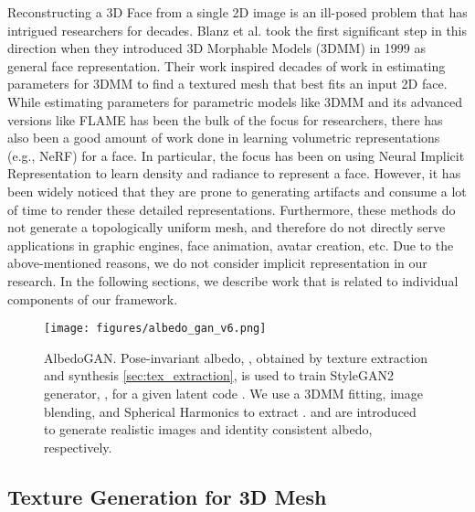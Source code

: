 \documentclass[10pt,twocolumn,letterpaper]{article}
\begin{document}
\label{sec:formatting}


Reconstructing a 3D Face from a single 2D image is an ill-posed problem that has intrigued researchers for decades. Blanz et al. \cite{3dmm} took the first significant step in this direction when they introduced 3D Morphable Models (3DMM) \cite{3dmm} in 1999 as general face representation. Their work inspired decades of work in estimating parameters for 3DMM to find a textured mesh that best fits an input 2D face. While estimating parameters for parametric models like 3DMM and its advanced versions like FLAME \cite{flame} has been the bulk of the focus for researchers, there has also been a good amount of work done in learning volumetric representations (e.g., NeRF) for a face. In particular, the focus has been on using Neural Implicit Representation \cite{neural-head-avatars, nerface, imavatar, lolnerf, pi_gan, mofa_nerf} to learn density and radiance to represent a face. However, it has been widely noticed that they are prone to generating artifacts and consume a lot of time to render these detailed representations. Furthermore, these methods do not generate a topologically uniform mesh, and therefore do not directly serve applications in graphic engines, face animation, avatar creation, etc. Due to the above-mentioned reasons, we do not consider implicit representation in our research. In the following sections, we describe work that is related to individual components of our framework.

\begin{figure*}[!ht]
\centering
\texttt{[image: figures/albedo\_gan\_v6.png]} 
\caption{AlbedoGAN. Pose-invariant albedo, , obtained by texture extraction and synthesis \ref{sec:tex_extraction}, is used to train StyleGAN2 generator, , for a given latent code . We use a 3DMM fitting, image blending, and Spherical Harmonics to extract .  and  are introduced to generate realistic images and identity consistent albedo, respectively.}
\label{fig:tex_prep}
\vspace{-2mm}
\end{figure*}



\vspace{-1mm}
\subsection{Texture Generation for 3D Mesh}
\end{document}
